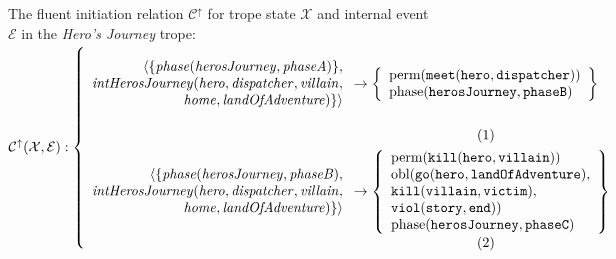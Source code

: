 \documentclass[11pt]{report}
\begin{document}
\begin{figure}[!t]
The fluent initiation relation $\mathcal{C^{\uparrow}}$ for trope state $\mathcal{X}$ and internal event $\mathcal{E}$ in the \emph{Hero's Journey} trope:\\
$\mathcal{C^{\uparrow}(X, E)}:\left\{\mbox{%
\begin{minipage}[c]{0.85\textwidth}
\begin{align}
\begin{array}{r}
                                 \langle \{\mathit{phase(herosJourney, phaseA)}\},\\
  \mathit{intHerosJourney(hero, dispatcher, villain},\\
\mathit{home, landOfAdventure)}\} \rangle
\end{array}
&\rightarrow
\left\{\begin{array}{l}
\text{perm}(\mathtt{meet(hero, dispatcher)})\\
\text{phase}(\mathtt{herosJourney, phaseB})
\end{array}\right\}\label{eq:cfirst-hero}\\
\begin{array}{r}
                                 \langle\{\mathit{phase(herosJourney, phaseB)},\\
  \mathit{intHerosJourney(hero, dispatcher, villain},\\ \mathit{home, landOfAdventure)}\} \rangle\\
  \end{array}
&\rightarrow \left\{
\begin{array}{l}
  \text{perm}(\mathtt{kill(hero, villain)}) \\
\text{obl}(\mathtt{go(hero, landOfAdventure),} \\
\mathtt{kill(villain, victim)},\\
\mathtt{viol(story, end)})\\
\text{phase}(\mathtt{herosJourney, phaseC})
\end{array}
\right\}\label{eq:phaseb}
\end{align}
\end{minipage}
}\right.$\smallskip



\end{figure}
\end{document}
